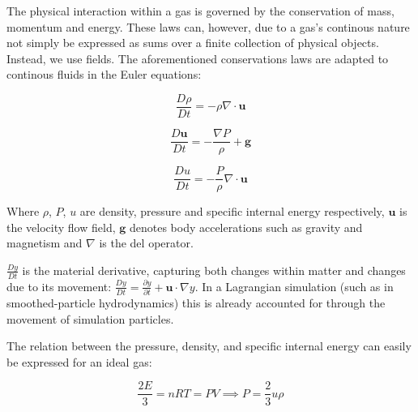 \documentclass[../main.tex]{subfiles}
\begin{document}
The physical interaction within a gas is governed by the conservation of mass, momentum and energy.
These laws can, however, due to a gas's continous nature not simply be expressed as sums over a
finite collection of physical objects. Instead, we use fields. The aforementioned conservations laws
are adapted to continous fluids in the Euler equations: \autocite{wikipedia_euler_equations}

\begin{equation}
    \frac{D\rho}{Dt}
    = - \rho \nabla \cdot \mathbf{u}
\end{equation}

\begin{equation}
    \frac{D\mathbf{u}}{Dt}
    = - \frac{\nabla P}{\rho} + \mathbf{g}
\end{equation}

\begin{equation}
    \frac{Du}{Dt}
    = - \frac{P}{\rho} \nabla \cdot \mathbf{u}
\end{equation}

Where $\rho$, $P$, $u$ are density, pressure and specific internal energy respectively,
$\mathbf{u}$ is the velocity flow field, $\mathbf{g}$ denotes body accelerations such as gravity
and magnetism and $\nabla$ is the del operator.

$\frac{Dy}{Dt}$ is the material derivative, capturing both changes within matter and changes due to its
movement: $\frac{Dy}{Dt} = \frac{\partial y}{\partial t} + \mathbf{u} \cdot \nabla y$. In a
Lagrangian simulation (such as in smoothed-particle hydrodynamics) this is already accounted for
through the movement of simulation particles.

The relation between the pressure, density, and specific internal energy can easily be expressed for
an ideal gas\autocite{wikipedia_ideal_gas}:

\begin{equation}
    \frac{2E}{3} = nRT = PV \implies P = \frac{2}{3} u \rho
\end{equation}
\end{document}
